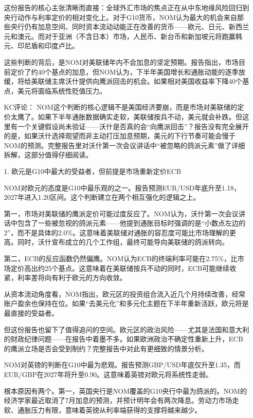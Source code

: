\documentclass[11pt]{ctexart}
\begin{document}
这份报告的核心主张清晰而直接：全球外汇市场的焦点正在从中东地缘风险回归到央行动作与利率定价的相对变化上。对于G10货币，NOM认为最大的机会来自那些央行仍有加息空间、同时资本流动动能正在改善的货币——欧元、日元、新西兰元和澳元。而对于亚洲（不含日本）市场，人民币、新台币和新加坡元将跑赢韩元、印尼盾和印度卢比。

这些判断的背后，是NOM对美联储年内不会加息的坚定预期。报告指出，市场目前定价了约40个基点的加息，但NOM认为，下半年美国增长和通胀动能的逐季放缓，将给美联储主席沃什提供向鹰派回击的机会。如果相对美国收益率下降40个基点，美元将面临系统性贬值压力。

KC评论： NOM这个判断的核心逻辑不是美国经济要崩，而是市场对美联储的定价太鹰了。如果下半年通胀数据确实走软，美联储按兵不动，美元就会补跌。但这里有一个关键假设尚未验证——沃什是否真的会“向鹰派回击”？报告没有完全展开的是，如果沃什选择观望而非主动打压加息预期，美元的下行节奏可能会慢于NOM的预测。完整报告里对沃什第一次会议讲话中“被忽略的鸽派元素”做了详细拆解，这部分值得仔细阅读。

1. 欧元是G10中最大的受益者，但前提是市场重新定价ECB

NOM对欧元的态度是G10中最乐观的之一。报告预测EUR/USD年底升至1.18，2027年进入1.20区间。这个判断建立在两个相互强化的逻辑之上。

第一，市场对美联储的鹰派定价可能过度反应了。NOM认为，沃什第一次会议讲话中包含了一些被忽视的鸽派元素——他提到通胀目标时强调的是“小数点左边的2”，而不是具体的2.0\%。这意味着美联储对通胀的容忍度可能比市场理解的更高。同时，沃什宣布成立的几个工作组，最终可能导向美联储的鸽派转向。

第二，ECB的反应函数仍然偏鹰。NOM认为ECB的终端利率可能在2.75\%，比市场定价高出约25个基点。这意味着在美联储按兵不动的同时，ECB可能继续收紧，利率差将向有利于欧元的方向收敛。

从资本流动角度看，NOM指出，欧元区的投资组合流入近几个月持续改善，经常账户盈余也保持在位。如果“去美元化”和多元化主题在下半年重新活跃，欧元将是最直接的受益者。

但这份报告也留下了值得追问的空间。欧元区的政治风险——尤其是法国和意大利的财政纪律问题——在报告中着墨不多。如果欧洲政治不确定性重新上升，ECB的鹰派立场是否会受到制约？完整报告中对此有更细致的情景分析。

NOM对英镑的判断在G10中最为悲观。报告预测GBP/USD年底仅升至1.35，而EUR/GBP在2027年将升至0.90。这意味着英镑对欧元将系统性走弱。

根本原因有两个。第一，英国央行是NOM覆盖的G10央行中最为鸽派的。NOM的经济学家最近取消了7月加息的预测，并预计明年会有两次降息。劳动力市场走软、通胀压力有限，意味着英镑从利率端获得的支撑将越来越少。
\end{document}
